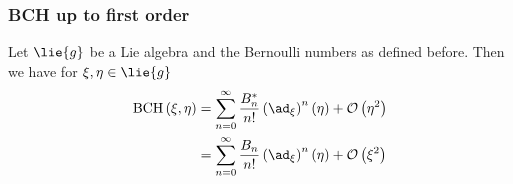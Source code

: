 \subsubsection{BCH up to first order}

\begin{proposition}
	Let $\lie{g}$ be a Lie algebra and the Bernoulli numbers as defined 
	before. Then we have for $\xi, \eta \in \lie{g}$
	\begin{align}
		\label{Alg:BCHFirstOrderXi}
		\bch{\xi}{\eta}
		& =
		\sum\limits_{n = 0}^{\infty}
		\frac{B_n^*}{n!}
		\left( \ad_{\xi} \right)^n (\eta)
		+ \mathcal{O} \left( \eta^2 \right)
		\\
		\label{Alg:BCHFirstOrderEta}
		& =
		\sum\limits_{n = 0}^{\infty}
		\frac{B_n}{n!}
		\left( \ad_{\xi} \right)^n (\eta)
		+ \mathcal{O} \left( \xi^2 \right)
	\end{align}
\end{proposition}
